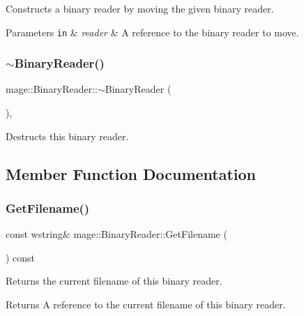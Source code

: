 Constructs a binary reader by moving the given binary reader.


\begin{DoxyParams}[1]{Parameters}
\mbox{\tt in}  & {\em reader} & A reference to the binary reader to move. \\
\hline
\end{DoxyParams}
\hypertarget{classmage_1_1_binary_reader_a42e6c31bc53f5214675f845756b5a404}{}\label{classmage_1_1_binary_reader_a42e6c31bc53f5214675f845756b5a404} 
\subsubsection{\texorpdfstring{$\sim$\+Binary\+Reader()}{~BinaryReader()}}
{\footnotesize\ttfamily mage\+::\+Binary\+Reader\+::$\sim$\+Binary\+Reader (\begin{DoxyParamCaption}{ }\end{DoxyParamCaption})\hspace{0.3cm}{\ttfamily [protected]}, {\ttfamily [default]}}

Destructs this binary reader. 

\subsection{Member Function Documentation}
\hypertarget{classmage_1_1_binary_reader_ad9d4a4a3e2f0afc666d15badff08fe4a}{}\label{classmage_1_1_binary_reader_ad9d4a4a3e2f0afc666d15badff08fe4a} 
\subsubsection{\texorpdfstring{Get\+Filename()}{GetFilename()}}
{\footnotesize\ttfamily const wstring\& mage\+::\+Binary\+Reader\+::\+Get\+Filename (\begin{DoxyParamCaption}{ }\end{DoxyParamCaption}) const\hspace{0.3cm}{\ttfamily [noexcept]}}

Returns the current filename of this binary reader.

\begin{DoxyReturn}{Returns}
A reference to the current filename of this binary reader. 
\end{DoxyReturn}
\hypertarget{classmage_1_1_binary_reader_aec91fece03b619c158b133beb1bc9381}{}\label{classmage_1_1_binary_reader_aec91fece03b619c158b133beb1bc9381} 
